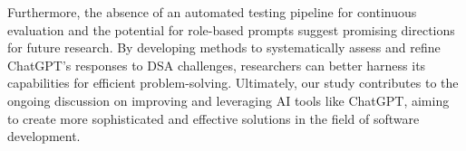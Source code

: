 Furthermore, the absence of an automated testing pipeline for continuous evaluation and the potential for role-based prompts suggest promising directions for future research. By developing methods to systematically assess and refine ChatGPT's responses to DSA challenges, researchers can better harness its capabilities for efficient problem-solving. Ultimately, our study contributes to the ongoing discussion on improving and leveraging AI tools like ChatGPT, aiming to create more sophisticated and effective solutions in the field of software development.~\\
